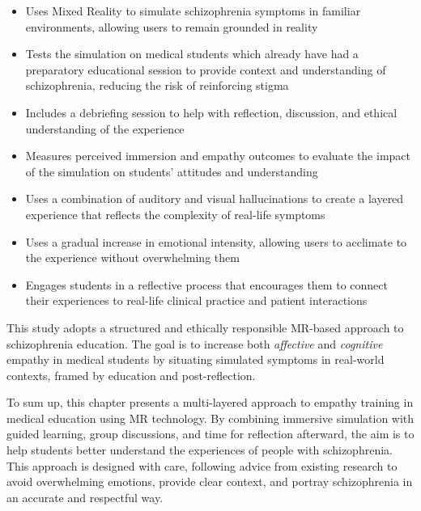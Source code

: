 \begin{itemize}
    \item Uses Mixed Reality to simulate schizophrenia symptoms in familiar environments, allowing users to remain grounded in reality
    \item Tests the simulation on medical students which already have had a preparatory educational session to provide context and understanding of schizophrenia, reducing the risk of reinforcing stigma
    \item Includes a debriefing session to help with reflection, discussion, and ethical understanding of the experience
    \item Measures perceived immersion and empathy outcomes to evaluate the impact of the simulation on students' attitudes and understanding
    \item Uses a combination of auditory and visual hallucinations to create a layered experience that reflects the complexity of real-life symptoms
    \item Uses a gradual increase in emotional intensity, allowing users to acclimate to the experience without overwhelming them
    \item Engages students in a reflective process that encourages them to connect their experiences to real-life clinical practice and patient interactions
\end{itemize}

This study adopts a structured and ethically responsible MR-based approach to schizophrenia education. The goal is to increase both \textit{affective} and \textit{cognitive} empathy in medical students by situating simulated symptoms in real-world contexts, framed by education and post-reflection. 

\vspace{1em}

To sum up, this chapter presents a multi-layered approach to empathy training in medical education using MR technology. By combining immersive simulation with guided learning, group discussions, and time for reflection afterward, the aim is to help students better understand the experiences of people with schizophrenia. This approach is designed with care, following advice from existing research to avoid overwhelming emotions, provide clear context, and portray schizophrenia in an accurate and respectful way.
